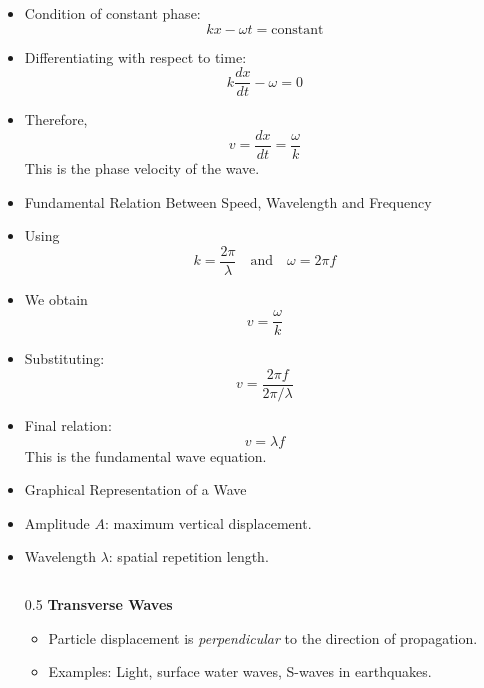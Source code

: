 \documentclass[t,aspectratio=169]{beamer}
\begin{document}
\begin{frame}
\begin{itemize}
\pagebreak
\item Condition of constant phase:
$$ kx - \omega t = \text{constant} $$ 
\item Differentiating with respect to time:
$$ k \frac{dx}{dt} - \omega = 0$$
\item Therefore,
$$ v = \frac{dx}{dt} = \frac{\omega}{k} $$ 
This is the phase velocity of the wave.

\pagebreak
\item Fundamental Relation Between Speed, Wavelength and Frequency
\item Using
$$ k = \frac{2\pi}{\lambda} \quad \text{and} \quad \omega = 2\pi f $$
\item We obtain
$$ v = \frac{\omega}{k} $$
\item Substituting:
$$ v = \frac{2\pi f}{2\pi / \lambda}$$
\item Final relation:
$$ \boxed{v = \lambda f}$$
This is the fundamental wave equation.

\pagebreak
\item Graphical Representation of a Wave
\begin{center}
\end{center}
\item Amplitude $A$: maximum vertical displacement.  
\item Wavelength $\lambda$: spatial repetition length.

\pagebreak
\begin{columns}
\begin{column}{0.5\textwidth}
\textbf{Transverse Waves}
\begin{itemize}
\item Particle displacement is \textit{perpendicular} to the direction of propagation.
\item Examples: Light, surface water waves, S-waves in earthquakes.
\end{itemize}
          

\end{column}
\end{columns}
\end{itemize}
\end{frame}
\end{document}

